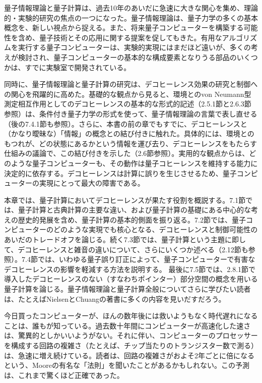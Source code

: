 \hypertarget{srcpage:293}{}\label{srcpage:293}
量子情報理論と量子計算は、過去10年のあいだに急速に大きな関心を集め、理論的・実験的研究の焦点の一つになった。量子情報理論は、量子力学の多くの基本概念を、新しい視点から捉える。また、将来量子コンピューターを構築する可能性を含め、量子技術とその応用に関する提案を促してもきた。有用なアルゴリズムを実行する量子コンピューターは、実験的実現にはまだほど遠いが、多くの考えが検討され、量子コンピューターの基本的な構成要素となりうる部品のいくつかは、すでに実験室で開発されている。

同時に、量子情報理論と量子計算の研究は、デコヒーレンス効果の研究と制御への関心を飛躍的に高めた。基礎的な観点から見ると、環境とのvon Neumann型測定相互作用としてのデコヒーレンスの基本的な形式的記述（2.5.1節と2.6.3節参照）は、条件付き量子力学の形式を使って、量子情報理論の言葉で表し直せる\cite{ref016,ref323}（後の7.4.1節も参照）。さらに、本書の前の章でもすでに、デコヒーレンスと（かなり曖昧な）「情報」の概念との結び付きに触れた。具体的には、環境とのもつれが、どの状態にあるかという情報を運び去り、デコヒーレンスをもたらす仕組みの議論で、この結び付きを示した（2.6節参照）。実用的な観点からは、どのような量子コンピューターも、その動作は量子コヒーレンスを維持する能力に決定的に依存する。デコヒーレンスは計算に誤りを生じさせるため、量子コンピューターの実現にとって最大の障害である。

本章では、量子計算においてデコヒーレンスが果たす役割を概説する。7.1節では、量子計算と古典計算の主要な違い、および量子計算の基礎にある中心的な考えの歴史的発展を含め、量子計算の基本的側面を振り返る。7.2節では、量子コンピューターのどのような実現でも核心となる、デコヒーレンスと制御可能性のあいだのトレードオフを論じる。続く7.3節では、量子計算という主題に即して、デコヒーレンスと雑音の違いについて、さらにいくつか述べる（2.12節も参照）。7.4節では、いわゆる量子誤り訂正によって、量子コンピューターで有害なデコヒーレンスの影響を軽減する方法を説明する。
\hypertarget{srcpage:294}{}\label{srcpage:294}
最後に7.5節では、2.8.1節で導入したデコヒーレンスのない（すなわちポインター）部分空間の概念を用いる量子計算を論じる。量子情報理論と量子計算全般についてさらに学びたい読者は、たとえばNielsenとChuangの著書\cite{ref056}に多くの内容を見いだすだろう。

今日買ったコンピューターが、ほんの数年後には救いようもなく時代遅れになることは、誰もが知っている。過去数十年間にコンピューターが高速化した速さは、驚異的としかいいようがない。それに伴い、コンピューターのプロセッサーを構成する回路の複雑さ（たとえば、チップ当たりのトランジスター数で測る）は、急速に増え続けている。読者は、回路の複雑さがおよそ2年ごとに倍になるという、Mooreの有名な「法則」を聞いたことがあるかもしれない。この予測は、これまで驚くほど正確であった。


